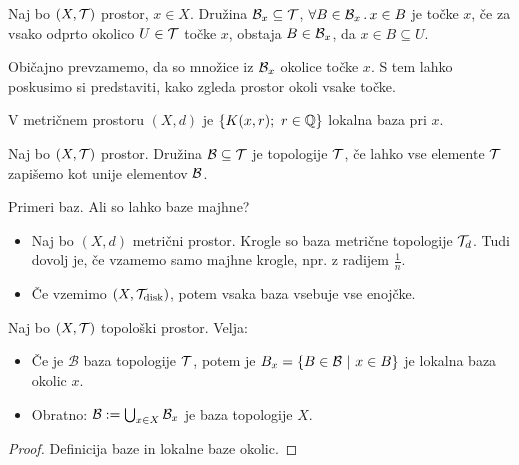 \begin{definicija}
    Naj bo $(X, \mathcal{T})$ prostor, $x \in X$. Družina $\mathcal{B}_x \subseteq \mathcal{T}$, $\forall B \in \mathcal{B}_x \,.\, x \in B$ je  točke $x$, če za vsako odprto okolico $U \in \mathcal{T}$ točke $x$, obstaja $B \in \mathcal{B}_x$, da $x \in B \subseteq U$.
\end{definicija}

\begin{opomba}
    Običajno prevzamemo, da so množice iz $\mathcal{B}_x$ okolice točke $x$. S tem lahko poskusimo si predstaviti, kako zgleda prostor okoli vsake točke.
\end{opomba}

\begin{primer}
    V metričnem prostoru $(X, d)$ je $\left\{K(x,r); \ r \in \mathbb{Q}\right\}$ lokalna baza pri $x$.
\end{primer}

\begin{definicija}
    Naj bo $(X, \mathcal{T})$ prostor. Družina $\mathcal{B} \subseteq \mathcal{T}$ je  topologije $\mathcal{T}$, če lahko vse elemente $\mathcal{T}$ zapišemo kot unije elementov $\mathcal{B}$.
\end{definicija}

\begin{primer}
    Primeri baz. Ali so lahko baze majhne?
    \begin{itemize}
        \item Naj bo $(X, d)$ metrični prostor. Krogle so baza metrične topologije $\mathcal{T}_d$. Tudi dovolj je, če vzamemo samo majhne krogle, npr. z radijem $\frac{1}{n}$.
        \item Če vzemimo $(X, \mathcal{T}_\text{disk})$, potem vsaka baza vsebuje vse enojčke.        
    \end{itemize}
\end{primer}

\begin{trditev}
    Naj bo $(X, \mathcal{T})$ topološki prostor. Velja:
    \begin{itemize}
        \item  Če je $\mathcal{B}$ baza topologije $\mathcal{T}$, potem je $B_x = \left\{B \in \mathcal{B} \ | \ x \in B\right\}$ je lokalna baza okolic $x$.
        \item Obratno: $\mathcal{B} := \bigcup_{x \in X} \mathcal{B}_x$ je baza topologije $X$.
    \end{itemize}    
\end{trditev}

\begin{proof}
    Definicija baze in lokalne baze okolic.
\end{proof}

